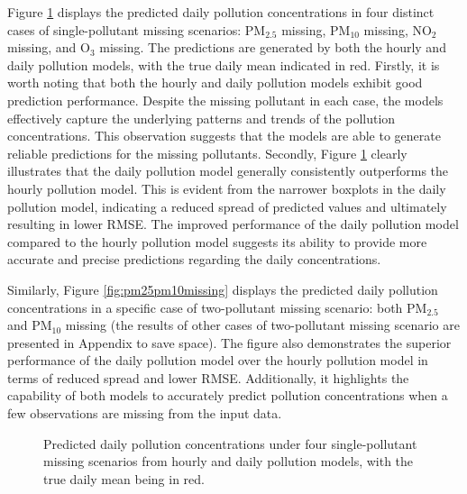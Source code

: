 \documentclass[
  12,
]{article}
\begin{document}
Figure \ref{fig:singleMissing} displays the predicted daily pollution
concentrations in four distinct cases of single-pollutant missing
scenarios: PM\(_{2.5}\) missing, PM\(_{10}\) missing, NO\(_2\) missing,
and O\(_3\) missing. The predictions are generated by both the hourly
and daily pollution models, with the true daily mean indicated in red.
Firstly, it is worth noting that both the hourly and daily pollution
models exhibit good prediction performance. Despite the missing
pollutant in each case, the models effectively capture the underlying
patterns and trends of the pollution concentrations. This observation
suggests that the models are able to generate reliable predictions for
the missing pollutants. Secondly, Figure \ref{fig:singleMissing} clearly
illustrates that the daily pollution model generally consistently
outperforms the hourly pollution model. This is evident from the
narrower boxplots in the daily pollution model, indicating a reduced
spread of predicted values and ultimately resulting in lower RMSE. The
improved performance of the daily pollution model compared to the hourly
pollution model suggests its ability to provide more accurate and
precise predictions regarding the daily concentrations.

Similarly, Figure \ref{fig:pm25pm10missing} displays the predicted daily
pollution concentrations in a specific case of two-pollutant missing
scenario: both PM\(_{2.5}\) and PM\(_{10}\) missing (the results of
other cases of two-pollutant missing scenario are presented in Appendix
to save space). The figure also demonstrates the superior performance of
the daily pollution model over the hourly pollution model in terms of
reduced spread and lower RMSE. Additionally, it highlights the
capability of both models to accurately predict pollution concentrations
when a few observations are missing from the input data.

\begin{figure}[H]
\caption[Predicted daily pollution concentrations under four single-pollutant missing scenarios from hourly and daily pollution models, with the true daily mean being in red]{Predicted daily pollution concentrations under four single-pollutant missing scenarios from hourly and daily pollution models, with the true daily mean being in red.}\label{fig:singleMissing}
\end{figure}
\end{document}
